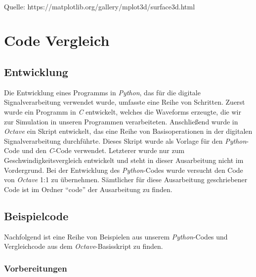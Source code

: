 \documentclass[11pt]{article}
\begin{document}
    \begin{center}
    \end{center}
    { \hspace*{\fill} \\}
    
    Quelle: https://matplotlib.org/gallery/mplot3d/surface3d.html

    \hypertarget{code-vergleich}{%
\section{Code Vergleich}\label{code-vergleich}}

\hypertarget{entwicklung}{%
\subsection{Entwicklung}\label{entwicklung}}

Die Entwicklung eines Programms in \emph{Python}, das für die digitale
Signalverarbeitung verwendet wurde, umfasste eine Reihe von Schritten.
Zuerst wurde ein Programm in \emph{C} entwickelt, welches die Waveforms
erzeugte, die wir zur Simulation in unseren Programmen verarbeiteten.
Anschließend wurde in \emph{Octave} ein Skript entwickelt, das eine
Reihe von Basisoperationen in der digitalen Signalverarbeitung
durchführte. Dieses Skript wurde als Vorlage für den \emph{Python}-Code
und den \emph{C}-Code verwendet. Letzterer wurde nur zum
Geschwindigkeitsvergleich entwickelt und steht in dieser Ausarbeitung
nicht im Vordergrund. Bei der Entwicklung des \emph{Python}-Codes wurde
versucht den Code von \emph{Octave} 1:1 zu übernehmen. Sämtlicher für
diese Ausarbeitung geschriebener Code ist im Ordner ``code'' der
Ausarbeitung zu finden.

\hypertarget{beispielcode}{%
\subsection{Beispielcode}\label{beispielcode}}

Nachfolgend ist eine Reihe von Beispielen aus unserem
\emph{Python}-Codes und Vergleichcode aus dem \emph{Octave}-Basisskript
zu finden.

\hypertarget{vorbereitungen}{%
\subsubsection{Vorbereitungen}\label{vorbereitungen}}
\end{document}
